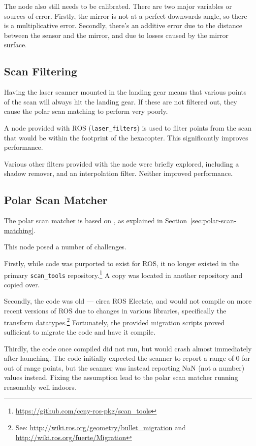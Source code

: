 \documentclass[12pt,oneside,a4paper]{book}
\begin{document}
The node also still needs to be calibrated. There are two major
variables or sources of error.  Firstly, the mirror is not at a
perfect downwards angle, so there is a multiplicative error. Secondly,
there's an additive error due to the distance between the sensor and
the mirror, and due to losses caused by the mirror surface.

\subsection{Scan Filtering}
\label{sec:scan-filtering}

Having the laser scanner mounted in the landing gear means that
various points of the scan will always hit the landing gear. If these
are not filtered out, they cause the polar scan matching to perform
very poorly.

A node provided with ROS (\texttt{laser\_filters}) is used to filter
points from the scan that would be within the footprint of the
hexacopter. This significantly improves performance.

Various other filters provided with the node were briefly explored,
including a shadow remover, and an interpolation filter. Neither
improved performance.

\subsection{Polar Scan Matcher}
\label{sec:polar-scan-matcher}

The polar scan matcher is based on \cite{polarscanmatching}, as
explained in Section~\ref{sec:polar-scan-matching}.

This node posed a number of challenges.

Firstly, while code was purported to exist for ROS, it no longer
existed in the primary \texttt{scan\_tools}
repository.\footnote{\url{https://github.com/ccny-ros-pkg/scan_tools}} A
copy was located in another repository and copied over.

Secondly, the code was old --- circa ROS Electric, and would not compile
on more recent versions of ROS due to changes in various libraries,
specifically the transform datatypes.\footnote{See:
  \url{http://wiki.ros.org/geometry/bullet_migration} and
  \url{http://wiki.ros.org/fuerte/Migration}} Fortunately, the
provided migration scripts proved sufficient to migrate the code and
have it compile.

Thirdly, the code once compiled did not run, but would crash almost
immediately after launching. The code initially expected the scanner
to report a range of 0 for out of range points, but the scanner was
instead reporting NaN (not a number) values instead. Fixing the
assumption lead to the polar scan matcher running reasonably well
indoors.
\end{document}
